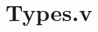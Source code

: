 \documentclass[DIV=26]{scrartcl}
\begin{document}
\section*{Types.v}
\inputminted[linenos, style=bw, breaklines]{coq}{Types.v}
\end{document}
